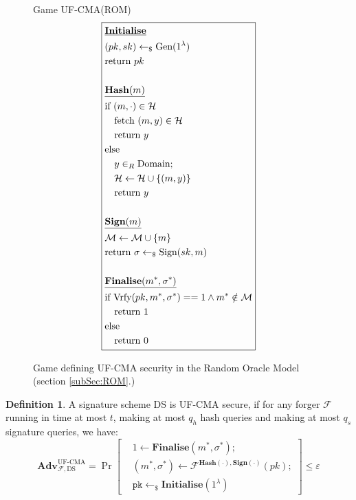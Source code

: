 \documentclass[]{final_report}
\theoremstyle{definition}
\newtheorem{definition}{Definition}[chapter]
\begin{document}
\begin{figure}[H]
\centering
\hfill Game UF-CMA(ROM)\hfill\phantom{} 
\[
\boxed{
\begin{aligned}
&\underline{\textbf{\text{Initialise}}} \\
&(pk, sk) \leftarrow_\$ \text{Gen}(1^\lambda) \\
&\text{return } pk \\
\\
&\underline{\textbf{\text{Hash}}(m)} \\
&\text{if } (m, \cdot) \in \mathcal{H} \\
&\quad \text{fetch } (m, y) \in \mathcal{H} \\
&\quad \text{return } y \\
&\text{else} \\
&\quad y \in_{R} \text{Domain}; \\
&\quad \mathcal{H} \leftarrow \mathcal{H} \cup\{(m, y)\} \\
&\quad \text{return } y \\
\\
&\underline{\textbf{\text{Sign}}(m)} \\
&\mathcal{M} \leftarrow \mathcal{M} \cup\{m\} \\
&\text{return } \sigma \leftarrow_{\$} \text{Sign}(sk, m) \\
\\
&\underline{\textbf{\text{Finalise}}(m^*, \sigma^*)} \\
&\text{if Vrfy}(pk, m^*, \sigma^*) == 1 \land m^* \notin \mathcal{M} \\
&\quad \text{return } 1 \\
&\text{else} \\
&\quad \text{return } 0
\end{aligned}
}
\]
\caption{Game defining UF-CMA security in the Random Oracle Model (section \ref{subSec:ROM}.)}
\label{fig:crypto_game}
\end{figure}
\begin{definition}
A signature scheme DS is UF-CMA secure, if for any forger $\mathcal{F}$ running in time at most $t$, making at most $q_h$ hash queries and making at most $q_s$ signature queries, we have:
\[
\textbf{Adv}_{\mathcal{F},\text{DS}}^{\text{UF-CMA}} = \Pr \left[ \begin{aligned} &1 \leftarrow \textbf{Finalise}(m^*, \sigma^*); \\ &(m^*, \sigma^*) \leftarrow \mathcal{F}^{\textbf{Hash}(\cdot),\textbf{Sign}(\cdot)}(pk); \\ &\texttt{pk} \leftarrow_{\$} \textbf{Initialise}(1^{\lambda}) \end{aligned} \right] \leq \varepsilon
\]
\end{definition}
\end{document}
